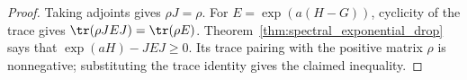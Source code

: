 \begin{proof}\leanok
    Taking adjoints gives $\rho J=\rho$. For $E=\exp(a(H-G))$, cyclicity of the
    trace gives $\tr(\rho JEJ)=\tr(\rho E)$.
    Theorem~\ref{thm:spectral_exponential_drop} says that
    $\exp(aH)-JEJ\ge0$. Its trace pairing with the positive matrix $\rho$ is
    nonnegative; substituting the trace identity gives the claimed inequality.
\end{proof}
